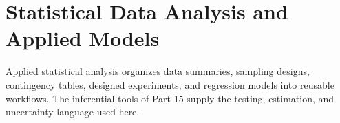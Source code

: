 \part{Statistical Data Analysis and Applied Models}

Applied statistical analysis organizes data summaries, sampling designs, contingency tables, designed experiments, and regression models into reusable workflows.  The inferential tools of Part 15 supply the testing, estimation, and uncertainty language used here.






